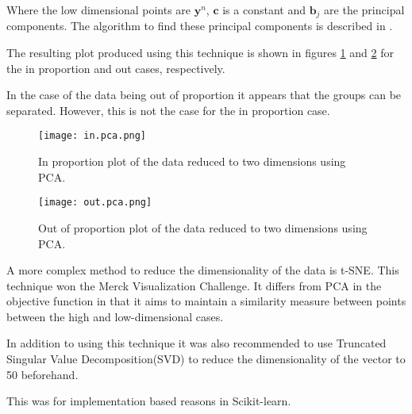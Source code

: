 Where the low dimensional points are $\pmb{y}^{n}$, $\pmb{c}$ is a constant and $\pmb{b}_{j}$ are the principal components.
The algorithm to find these principal components is described in \textcite[333]{barber_bayesian_2013}.

The resulting plot produced using this technique is shown in figures \ref{fig:inpca} and \ref{fig:outpca} for the in proportion and out cases, respectively.

In the case of the data being out of proportion it appears that the groups can be separated.
However, this is not the case for the in proportion case.

\begin{figure}
    \centering
    \texttt{[image: in.pca.png]}
    \caption{In proportion plot of the data reduced to two dimensions using \ac{PCA}.}
    \label{fig:inpca}
\end{figure}

\begin{figure}
    \texttt{[image: out.pca.png]}
    \centering
    \caption{Out of proportion plot of the data reduced to two dimensions using \ac{PCA}.}
    \label{fig:outpca}
\end{figure}


A more complex method to reduce the dimensionality of the data is t-SNE\autocite{van_der_maaten_visualizing_2008}.
This technique won the Merck Visualization Challenge.   
It differs from \ac{PCA} in the objective function in that it aims to maintain a similarity measure between points between the high and low-dimensional cases.

In addition to using this technique it was also recommended to use Truncated Singular Value Decomposition(SVD) to reduce the dimensionality of the vector to 50 beforehand.

This was for implementation based reasons in Scikit-learn.


